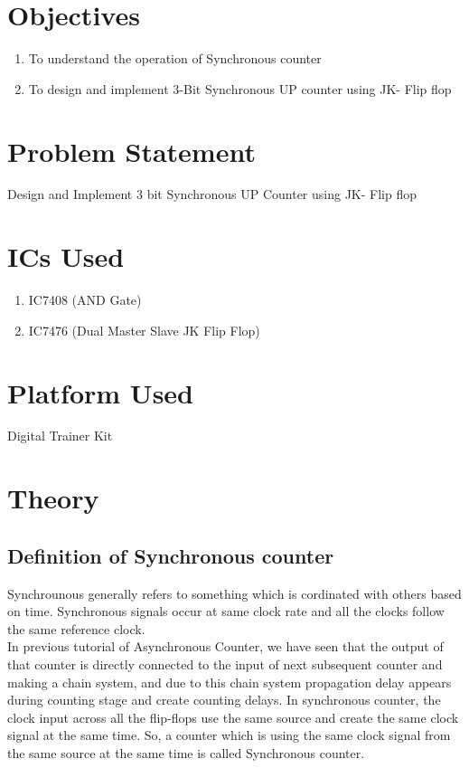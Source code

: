 \documentclass[11pt]{article}
\begin{document}
\tableofcontents
\thispagestyle{empty}
\clearpage


\setcounter{page}{1}
\section{Objectives}
\begin{enumerate}
	\item To understand the operation of Synchronous counter
	\item To design and implement 3-Bit Synchronous UP counter using JK- Flip flop
	
\end{enumerate}

\section{Problem Statement}
Design and Implement 3 bit Synchronous UP Counter using JK- Flip flop 

\section{ICs Used}

\begin{enumerate}
	\item IC7408 (AND Gate)
	\item IC7476 (Dual Master Slave JK Flip Flop)
\end{enumerate}

\section{Platform Used}
Digital Trainer Kit

\section{Theory}
\subsection{Definition of Synchronous counter}
Synchrounous generally refers to something which is cordinated with others based on time. Synchronous signals occur at same clock rate and all the clocks follow the same reference clock.\\

In previous tutorial of Asynchronous Counter, we have seen that the output of that counter is directly connected to the input of next subsequent counter and making a chain system, and due to this chain system propagation delay appears during counting stage and create counting delays. In synchronous counter, the clock input across all the flip-flops use the same source and create the same clock signal at the same time. So, a counter which is using the same clock signal from the same source at the same time is called Synchronous counter.
\end{document}
